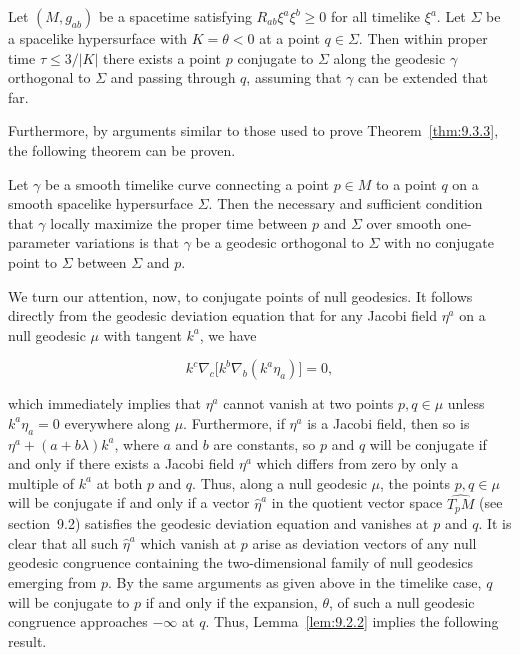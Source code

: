\begin{proposition}\label{prop:9.3.4}
Let \((M,g_{ab})\) be a spacetime satisfying \(R_{ab}\xi^a\xi^b\geq0\) for all
timelike \(\xi^a\). Let \(\Sigma\) be a spacelike hypersurface with \(K=\theta<0\)
at a point \(q\in\Sigma\). Then within proper time \(\tau\leq3/\lvert K\rvert\)
there exists a point \(p\) conjugate to \(\Sigma\) along the geodesic \(\gamma\)
orthogonal to \(\Sigma\) and passing through \(q\), assuming that \(\gamma\) can
be extended that far.
\end{proposition}



Furthermore, by arguments similar to those used to prove Theorem~\ref{thm:9.3.3},
the following theorem can be proven.

\begin{theorem}\label{thm:9.3.5}
Let \(\gamma\) be a smooth timelike curve connecting a point \(p\in M\) to a point
\(q\) on a smooth spacelike hypersurface \(\Sigma\). Then the necessary and
sufficient condition that \(\gamma\) locally maximize the proper time between \(p\)
and \(\Sigma\) over smooth one-parameter variations is that \(\gamma\) be a geodesic
orthogonal to \(\Sigma\) with no conjugate point to \(\Sigma\) between \(\Sigma\)
and \(p\).
\end{theorem}


We turn our attention, now, to conjugate points of null geodesics. It follows directly
from the geodesic deviation equation that for any Jacobi field \(\eta^a\) on a null
geodesic \(\mu\) with tangent \(k^a\), we have

\begin{equation}
  k^c\nabla_c\bigl[k^b\nabla_b(k^a\eta_a)\bigr]=0 ,
  \tag{9.3.24}\label{eq:9.3.24}
\end{equation}

which immediately implies that \(\eta^a\) cannot vanish at two points
\(p,q\in\mu\) unless \(k^a\eta_a=0\) everywhere along \(\mu\). Furthermore, if
\(\eta^a\) is a Jacobi field, then so is \(\eta^a+(a+b\lambda)k^a\), where \(a\) and
\(b\) are constants, so \(p\) and \(q\) will be conjugate if and only if there exists a
Jacobi field \(\eta^a\) which differs from zero by only a multiple of \(k^a\) at both
\(p\) and \(q\). Thus, along a null geodesic \(\mu\), the points \(p,q\in\mu\) will be
conjugate if and only if a vector \(\widehat\eta^a\) in the quotient vector space
\(\widehat{T_pM}\) (see section~9.2) satisfies the geodesic deviation equation and
vanishes at \(p\) and \(q\). It is clear that all such \(\widehat\eta^a\) which vanish at
\(p\) arise as deviation vectors of any null geodesic congruence containing the
two-dimensional family of null geodesics emerging from \(p\). By the same arguments
as given above in the timelike case, \(q\) will be conjugate to \(p\) if and only if the
expansion, \(\theta\), of such a null geodesic congruence approaches \(-\infty\) at \(q\).
Thus, Lemma~\ref{lem:9.2.2} implies the following result.

